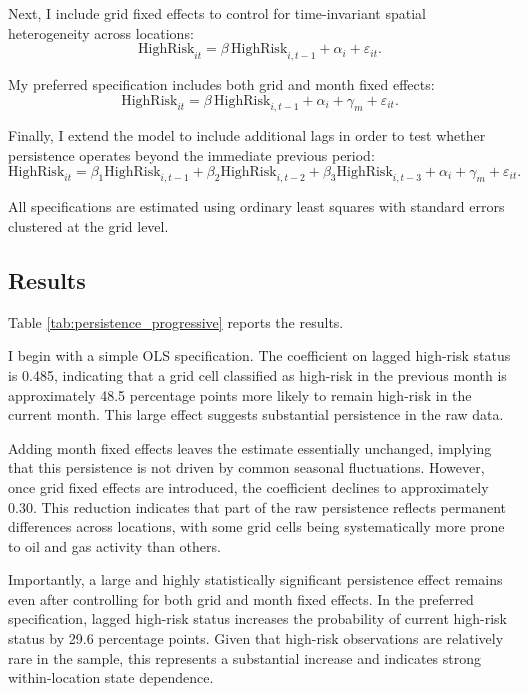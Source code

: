 \documentclass[12pt]{article}
\begin{document}
Next, I include grid fixed effects to control for time-invariant spatial heterogeneity across locations:
\begin{equation}
\text{HighRisk}_{it} = \beta \, \text{HighRisk}_{i,t-1} + \alpha_i + \varepsilon_{it}.
\end{equation}

My preferred specification includes both grid and month fixed effects:
\begin{equation}
\text{HighRisk}_{it} = \beta \, \text{HighRisk}_{i,t-1} + \alpha_i + \gamma_m + \varepsilon_{it}.
\end{equation}

Finally, I extend the model to include additional lags in order to test whether persistence operates beyond the immediate previous period:
\begin{equation}
\text{HighRisk}_{it} = \beta_1 \text{HighRisk}_{i,t-1} + \beta_2 \text{HighRisk}_{i,t-2} + \beta_3 \text{HighRisk}_{i,t-3} + \alpha_i + \gamma_m + \varepsilon_{it}.
\end{equation}

All specifications are estimated using ordinary least squares with standard errors clustered at the grid level.

\subsection{Results}

Table \ref{tab:persistence_progressive} reports the results.

I begin with a simple OLS specification. The coefficient on lagged high-risk status is 0.485, indicating that a grid cell classified as high-risk in the previous month is approximately 48.5 percentage points more likely to remain high-risk in the current month. This large effect suggests substantial persistence in the raw data.

Adding month fixed effects leaves the estimate essentially unchanged, implying that this persistence is not driven by common seasonal fluctuations. However, once grid fixed effects are introduced, the coefficient declines to approximately 0.30. This reduction indicates that part of the raw persistence reflects permanent differences across locations, with some grid cells being systematically more prone to oil and gas activity than others.

Importantly, a large and highly statistically significant persistence effect remains even after controlling for both grid and month fixed effects. In the preferred specification, lagged high-risk status increases the probability of current high-risk status by 29.6 percentage points. Given that high-risk observations are relatively rare in the sample, this represents a substantial increase and indicates strong within-location state dependence.
\end{document}
